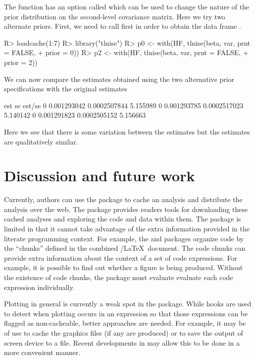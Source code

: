 \documentclass[nojss]{jss}
\begin{document}
The  function has an option called  which can
be used to change the nature of the prior distribution on the
second-level covariance matrix.  Here we try two alternate priors.
First, we need to call  first in order to obtain the
data frame .
\begin{Schunk}
\begin{Sinput}
R> loadcache(1:7)
R> library("tlnise")
R> p0 <- with(HF, tlnise(beta, var, prnt = FALSE, 
+     prior = 0))
R> p2 <- with(HF, tlnise(beta, var, prnt = FALSE, 
+     prior = 2))
\end{Sinput}
\end{Schunk}
We can now compare the estimates obtained using the two alternative
prior specifications with the original estimates
\begin{Schunk}
\begin{Soutput}
          est           se   est/se
0 0.001293042 0.0002507844 5.155989
0 0.001293785 0.0002517023 5.140142
0 0.001291823 0.0002505152 5.156663
\end{Soutput}
\end{Schunk}
Here we see that there is some variation between the estimates but the
estimates are qualitatively similar.


\section{Discussion and future work}

Currently, authors can use the  package to cache an
analysis and distribute the analysis over the web.  The package
provides readers tools for downloading these cached analyses and
exploring the code and data within them.  The  package is
limited in that it cannot take advantage of the extra information
provided in the literate programming context.  For example, the
 and  packages organize code by the
``chunks'' defined in the combined /\LaTeX\ document.  The
code chunks can provide extra information about the context of a set
of code expressions.  For example, it is possible to find out whether
a figure is being produced.  Without the existence of code chunks, the
 package must evaluate evaluate each code expression
individually.

Plotting in general is currently a weak spot in the 
package.  While hooks are used to detect when plotting occurs in an
expression so that those expressions can be flagged as non-cacheable,
better approaches are needed.  For example, it may be of use to cache
the graphics files (if any are produced) or to save the output of
screen device to a file.  Recent developments in  may
allow this to be done in a more convenient manner.
\end{document}
